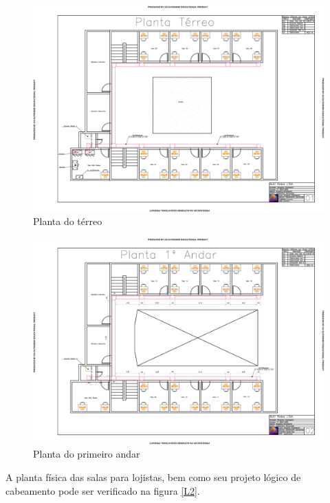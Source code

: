 \documentclass[	DIV=calc,%
							paper=a4,%
							fontsize=12pt,%
							onecolumn]{scrartcl}	 					%
\begin{document}
\begin{figure}
\centering
\includegraphics[width=\textwidth]{L1}
\caption{Planta do térreo}
\label{L1}
\end{figure}

\begin{figure}
\centering
\includegraphics[width=\textwidth]{L3}
\caption{Planta do primeiro andar}
\label{L3}
\end{figure}
A planta física das salas para lojistas, bem como seu projeto lógico de cabeamento pode ser verificado na figura \ref{L2}.
\end{document}

